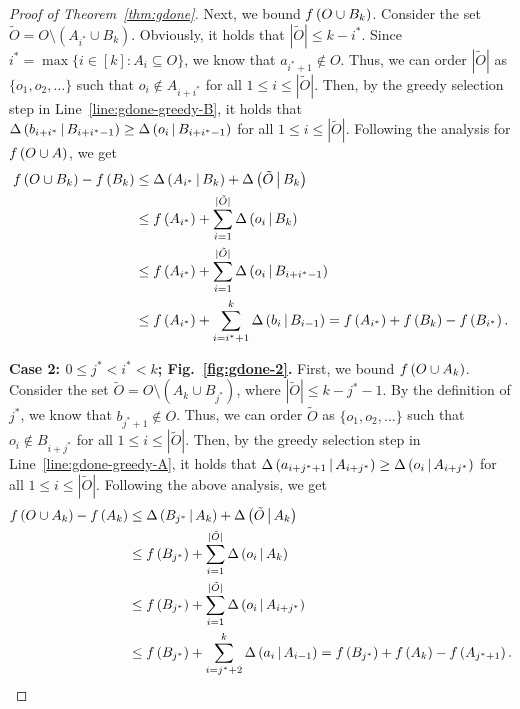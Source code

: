 \begin{proof}[Proof of Theorem~\ref{thm:gdone}]
Next, we bound $f \left( O\cup B_k \right)$.
Consider the set $\tilde{O} = O\setminus \left(A_{i^*} \cup B_{k}\right)$.
Obviously, it holds that $|\tilde{O}| \le k-i^*$.
Since $i^* = \max\{i \in [k]: A_i\subseteq O\}$,
we know that $a_{i^*+1} \not \in O$.
Thus, we can order $|\tilde{O}|$ as $\{o_1, o_2, \ldots\}$
such that $o_i \not \in A_{i+i^*}$ for all $1\le i \le |\tilde{O}|$.
Then, by the greedy selection step in Line~\ref{line:gdone-greedy-B},
it holds that $\Delta \left( b_{i+i^*} \, \middle| \, B_{i+i^*-1} \right)\ge \Delta \left( o_i \, \middle| \, B_{i+i^*-1} \right)$
for all $1\le i \le |\tilde{O}|$.
Following the analysis for $f \left( O\cup A \right)$,
we get
\begin{align*}
f \left( O\cup B_k \right) - f \left( B_k \right) &\le \Delta \left( A_{i^*} \, \middle| \, B_k \right) + \Delta \left( \tilde{O} \, \middle| \, B_k \right)\\
&\le f \left( A_{i^*} \right) + \sum\limits_{i=1}^{|\tilde{O}|} \Delta \left( o_i \, \middle| \, B_k \right)\\
&\le f \left( A_{i^*} \right) + \sum\limits_{i=1}^{|\tilde{O}|} \Delta \left( o_i \, \middle| \, B_{i+i^*-1} \right)\\
&\le f \left( A_{i^*} \right) + \sum\limits_{i=i^*+1}^{k} \Delta \left( b_i \, \middle| \, B_{i-1} \right)
= f \left( A_{i^*} \right) + f \left( B_k \right) - f \left( B_{i^*} \right).
\end{align*}

\textbf{Case 2: $0\le j^* < i^* < k$; Fig.~\ref{fig:gdone-2}.}
First, we bound $f \left( O\cup A_k \right)$.
Consider the set $\tilde{O} = O\setminus \left(A_{k}\cup B_{j^*}\right)$,
where $|\tilde{O}| \le k-j^*-1$.
By the definition of $j^*$,
we know that $b_{j^*+1}\not\in O$.
Thus, we can order $\tilde{O}$ as $\{o_1, o_2, \ldots\}$
such that $o_i\not \in B_{i+j^*}$ for all $1\le i\le |\tilde{O}|$.
Then, by the greedy selection step in Line~\ref{line:gdone-greedy-A},
it holds that $\Delta \left( a_{i+j^*+1} \, \middle| \, A_{i+j^*} \right)\ge \Delta \left( o_i \, \middle| \, A_{i+j^*} \right)$
for all $1\le i\le |\tilde{O}|$.
Following the above analysis, we get
\begin{align*}
f \left( O\cup A_k \right)-f \left( A_k \right) &\le \Delta \left( B_{j^*} \, \middle| \, A_k \right)+\Delta \left( \tilde{O} \, \middle| \, A_k \right)\\
&\le f \left( B_{j^*} \right) + \sum\limits_{i=1}^{|\tilde{O}|} \Delta \left( o_i \, \middle| \, A_k \right)\\
&\le f \left( B_{j^*} \right) + \sum\limits_{i=1}^{|\tilde{O}|} \Delta \left( o_i \, \middle| \, A_{i+j^*} \right)\\
&\le f \left( B_{j^*} \right) + \sum\limits_{i=j^*+2}^{k} \Delta \left( a_i \, \middle| \, A_{i-1} \right)
= f \left( B_{j^*} \right) + f \left( A_k \right)-f \left( A_{j^*+1} \right).
\end{align*}


\end{proof}
